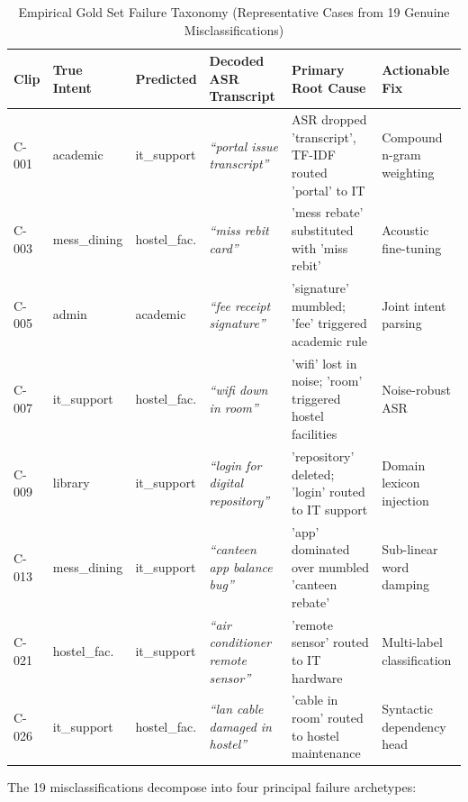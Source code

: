 \documentclass[sigconf,authordraft]{acmart}
\begin{document}
\begin{table}[t]
  \caption{Empirical Gold Set Failure Taxonomy (Representative Cases from 19 Genuine Misclassifications)}
  \label{tab:errors}
  \centering
  \small
  \begin{tabular}{llllll}
    \toprule
    \textbf{Clip} & \textbf{True Intent} & \textbf{Predicted} & \textbf{Decoded ASR Transcript} & \textbf{Primary Root Cause} & \textbf{Actionable Fix} \\
    \midrule
    C-001 & academic & it\_support & \emph{``portal issue transcript''} & ASR dropped 'transcript', TF-IDF routed 'portal' to IT & Compound n-gram weighting \\
    C-003 & mess\_dining & hostel\_fac. & \emph{``miss rebit card''} & 'mess rebate' substituted with 'miss rebit' & Acoustic fine-tuning \\
    C-005 & admin & academic & \emph{``fee receipt signature''} & 'signature' mumbled; 'fee' triggered academic rule & Joint intent parsing \\
    C-007 & it\_support & hostel\_fac. & \emph{``wifi down in room''} & 'wifi' lost in noise; 'room' triggered hostel facilities & Noise-robust ASR \\
    C-009 & library & it\_support & \emph{``login for digital repository''} & 'repository' deleted; 'login' routed to IT support & Domain lexicon injection \\
    C-013 & mess\_dining & it\_support & \emph{``canteen app balance bug''} & 'app' dominated over mumbled 'canteen rebate' & Sub-linear word damping \\
    C-021 & hostel\_fac. & it\_support & \emph{``air conditioner remote sensor''} & 'remote sensor' routed to IT hardware & Multi-label classification \\
    C-026 & it\_support & hostel\_fac. & \emph{``lan cable damaged in hostel''} & 'cable in room' routed to hostel maintenance & Syntactic dependency head \\
    \bottomrule
  \end{tabular}
\end{table}

The 19 misclassifications decompose into four principal failure archetypes:
\end{document}
